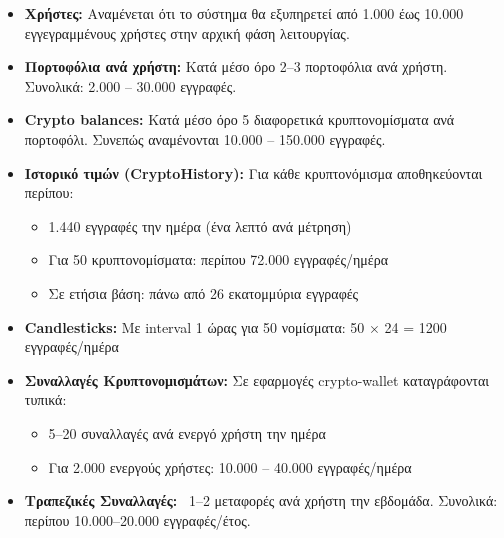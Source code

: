 \documentclass[a4paper,12pt]{article}
\begin{document}
\begin{itemize}

  \item \textbf{Χρήστες:} 
  Αναμένεται ότι το σύστημα θα εξυπηρετεί από 1.000 έως 10.000 εγγεγραμμένους χρήστες 
  στην αρχική φάση λειτουργίας.

  \item \textbf{Πορτοφόλια ανά χρήστη:} 
  Κατά μέσο όρο 2--3 πορτοφόλια ανά χρήστη. 
  Συνολικά: 2.000 -- 30.000 εγγραφές.

  \item \textbf{Crypto balances:} 
  Κατά μέσο όρο 5 διαφορετικά κρυπτονομίσματα ανά πορτοφόλι.  
  Συνεπώς αναμένονται 10.000 -- 150.000 εγγραφές.

  \item \textbf{Ιστορικό τιμών (CryptoHistory):}  
  Για κάθε κρυπτονόμισμα αποθηκεύονται περίπου:
  \begin{itemize}
    \item 1.440 εγγραφές την ημέρα (ένα λεπτό ανά μέτρηση)
    \item Για 50 κρυπτονομίσματα: περίπου 72.000 εγγραφές/ημέρα
    \item Σε ετήσια βάση: πάνω από 26 εκατομμύρια εγγραφές
  \end{itemize}

  \item \textbf{Candlesticks:}  
  Με interval 1 ώρας για 50 νομίσματα: 
  50 \(\times\) 24 = 1200 εγγραφές/ημέρα

  \item \textbf{Συναλλαγές Κρυπτονομισμάτων:}  
  Σε εφαρμογές crypto-wallet καταγράφονται τυπικά:
  \begin{itemize}
    \item 5--20 συναλλαγές ανά ενεργό χρήστη την ημέρα
    \item Για 2.000 ενεργούς χρήστες: 10.000 -- 40.000 εγγραφές/ημέρα
  \end{itemize}

  \item \textbf{Τραπεζικές Συναλλαγές:}  
  ~1--2 μεταφορές ανά χρήστη την εβδομάδα.
  Συνολικά: περίπου 10.000--20.000 εγγραφές/έτος.

\end{itemize}

\newpage
\end{document}
